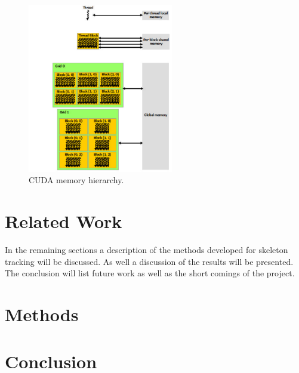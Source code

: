 \documentclass[conference]{IEEEtran}
\begin{document}
\begin{figure}[!t]
\centering
\includegraphics[width=2.5in]{memory-hierarchy}
\caption{CUDA memory hierarchy.}
\label{fig:memoryhierarchy}
\end{figure}

\section{Related Work}
\label{sec:relatedwork}

In the remaining sections a description of the methods developed for skeleton tracking will be discussed. As well a discussion of the results will be presented. The conclusion will list future work as well as the short comings of the project.
\section{Methods}
\label{sec:method}

\section{Conclusion}
\label{sec:clonclusion}



\end{document}
